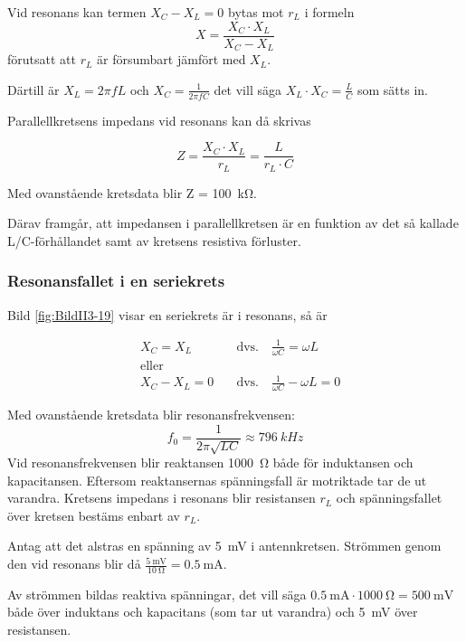 Vid resonans kan termen \(X_C - X_L = 0\) bytas mot \(r_L\) i formeln
\[X = \frac{X_C \cdot X_L}{X_C - X_L}\] förutsatt att \(r_L\) är försumbart
jämfört med \(X_L\).

Därtill är \(X_L = 2\pi fL\) och \(X_C = \frac{1}{2\pi fC}\) det vill säga
\(X_L \cdot X_C = \frac{L}{C}\) som sätts in.

Parallellkretsens impedans vid resonans kan då skrivas

\[
Z = \frac{X_C \cdot X_L}{r_L} = \frac{L}{r_L \cdot C}
\]

Med ovanstående kretsdata blir Z = \SI{100}{\kilo\ohm}.

Därav framgår, att impedansen i parallellkretsen är en funktion av det så
kallade L/C-förhållandet samt av kretsens resistiva förluster.

\newpage %

\subsubsection{Resonansfallet i en seriekrets}
\label{serieresonans}


Bild \ref{fig:BildII3-19} visar en seriekrets är i resonans, så är

\begin{align*}
& X_C = X_L \quad & \text{dvs.} \quad \frac{1}{\omega C} = \omega L\\
& \text{eller} & \\
& X_C - X_L = 0 \quad & \text{dvs.} \quad \frac{1}{\omega C} - \omega L = 0
\end{align*}

Med ovanstående kretsdata blir resonansfrekvensen:
%
\[
f_0 = \frac{1}{2\pi \sqrt{LC}} \approx 796\ kHz
\]
%
Vid resonansfrekvensen blir reaktansen \SI{1000}{\ohm} både för induktansen och
kapacitansen.
Eftersom reaktansernas spänningsfall är motriktade tar de ut varandra.
Kretsens impedans i resonans blir resistansen \(r_L\) och
spänningsfallet över kretsen bestäms enbart av \(r_L\).

Antag att det alstras en spänning av \SI{5}{\milli\volt} i antennkretsen.
Strömmen genom den vid resonans blir då
\(\frac{\SI{5}{\milli\volt}}{\SI{10}{\ohm}} = \SI{0,5}{\milli\ampere}\).

Av strömmen bildas reaktiva spänningar, det vill säga \(\SI{0,5}{\milli\ampere}
\cdot \SI{1000}{\ohm} = \SI{500}{\milli\volt}\) både över induktans och
kapacitans (som tar ut varandra) och \SI{5}{\milli\volt} över resistansen.

